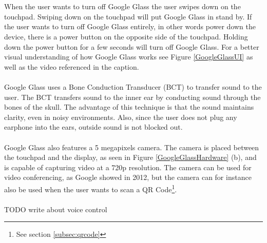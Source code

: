 \\
\\
When the user wants to turn off Google Glass the user swipes down on the touchpad. Swiping down on the touchpad will put Google Glass in stand by. If the user wants to turn off Google Glass entirely, in other words power down the device, there is a power button on the opposite side of the touchpad. Holding down the power button for a few seconds will turn off Google Glass. For a better visual understanding of how Google Glass works see Figure \ref{GoogleGlassUI} as well as the video referenced in the caption.
\\
\\
Google Glass uses a Bone Conduction Transducer (BCT) to transfer sound to the user.\cite{GlassSpecs} The BCT transfers sound to the inner ear by conducting sound through the bones of the skull.\cite{boneConductionWiki} The advantage of this technique is that the sound maintains clarity, even in noisy environments. Also, since the user does not plug any earphone into the ears, outside sound is not blocked out.
\\
\\
Google Glass also features a 5 megapixels camera. The camera is placed between the touchpad and the display, as seen in Figure \ref{GoogleGlassHardware} (b), and is capable of capturing video at a 720p resolution. The camera can be used for video conferencing, as Google showed in 2012\cite{glassLiveDemo}, but the camera can for instance also be used when the user wants to scan a QR Code\footnote{See section \ref{subsec:qrcode}}.
\\
\\
TODO write about voice control




